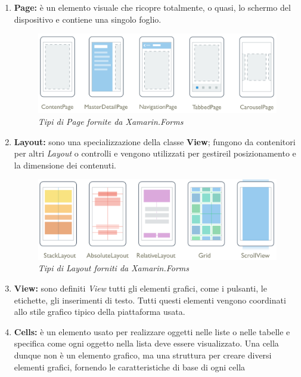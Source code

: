 \begin{enumerate}
	\item \textbf{Page:} è un elemento visuale che ricopre totalmente, o quasi, lo schermo del dispositivo e contiene una singolo foglio.
	
	\begin{figure}[ht]
		\centering
		\includegraphics[scale=0.30]{immagini/progettazione/page-types.png}
		\caption{\textit{Tipi di Page fornite da Xamarin.Forms}}
	\end{figure}\FloatBarrier
	
	\item \textbf{Layout:} sono una specializzazione della classe \textbf{View}; fungono da contenitori per altri \textit{Layout} o controlli e vengono utilizzati per gestireil posizionamento e la dimensione dei contenuti.
	
		\begin{figure}[ht]
			\centering
			\includegraphics[scale=0.33]{immagini/progettazione/Layouts.png}
			\caption{\textit{Tipi di Layout forniti da Xamarin.Forms}}
		\end{figure}\FloatBarrier
		
		\item \textbf{View:} sono definiti \textit{View} tutti gli elementi grafici, come i pulsanti, le etichette, gli inserimenti di testo. Tutti questi elementi vengono coordinati allo stile grafico tipico della piattaforma usata.
		
		\item \textbf{Cells:} è un elemento usato per realizzare oggetti nelle liste o nelle tabelle e specifica come ogni oggetto nella lista deve essere visualizzato. Una cella dunque non è un elemento grafico, ma una struttura per creare diversi elementi grafici, fornendo le caratteristiche di base di ogni cella
		
\end{enumerate}

